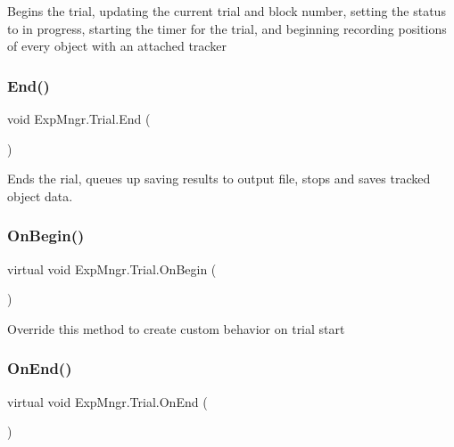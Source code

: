 Begins the trial, updating the current trial and block number, setting the status to in progress, starting the timer for the trial, and beginning recording positions of every object with an attached tracker 

\mbox{\label{class_exp_mngr_1_1_trial_a34bdc21e8c6b5a686d893ca5ecd1b916}} 
\subsubsection{\texorpdfstring{End()}{End()}}
{\footnotesize\ttfamily void Exp\+Mngr.\+Trial.\+End (\begin{DoxyParamCaption}{ }\end{DoxyParamCaption})}



Ends the rial, queues up saving results to output file, stops and saves tracked object data. 

\mbox{\label{class_exp_mngr_1_1_trial_ae187535e400451e0df950a4c7a5fe0bc}} 
\subsubsection{\texorpdfstring{On\+Begin()}{OnBegin()}}
{\footnotesize\ttfamily virtual void Exp\+Mngr.\+Trial.\+On\+Begin (\begin{DoxyParamCaption}{ }\end{DoxyParamCaption})\hspace{0.3cm}{\ttfamily [virtual]}}



Override this method to create custom behavior on trial start 

\mbox{\label{class_exp_mngr_1_1_trial_a0c010c02f70930a36b52c6d828040b5a}} 
\subsubsection{\texorpdfstring{On\+End()}{OnEnd()}}
{\footnotesize\ttfamily virtual void Exp\+Mngr.\+Trial.\+On\+End (\begin{DoxyParamCaption}{ }\end{DoxyParamCaption})\hspace{0.3cm}{\ttfamily [virtual]}}



